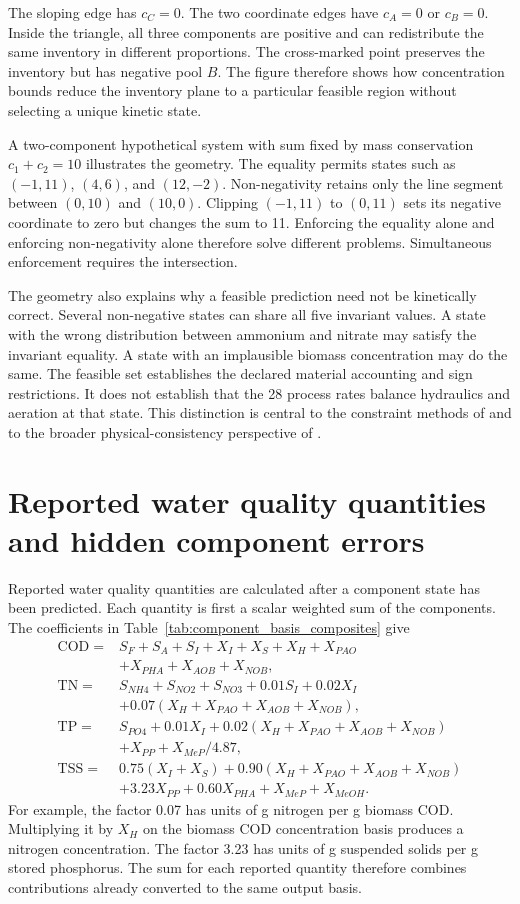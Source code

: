 The sloping edge has $c_C=0$. The two coordinate edges have $c_A=0$ or $c_B=0$. Inside the triangle, all three components are positive and can redistribute the same inventory in different proportions. The cross-marked point preserves the inventory but has negative pool $B$. The figure therefore shows how concentration bounds reduce the inventory plane to a particular feasible region without selecting a unique kinetic state.

A two-component hypothetical system with sum fixed by mass conservation $c_1+c_2=10$ illustrates the geometry. The equality permits states such as $(-1,11)$, $(4,6)$, and $(12,-2)$. Non-negativity retains only the line segment between $(0,10)$ and $(10,0)$. Clipping $(-1,11)$ to $(0,11)$ sets its negative coordinate to zero but changes the sum to 11. Enforcing the equality alone and enforcing non-negativity alone therefore solve different problems. Simultaneous enforcement requires the intersection.

The geometry also explains why a feasible prediction need not be kinetically correct. Several non-negative states can share all five invariant values. A state with the wrong distribution between ammonium and nitrate may satisfy the invariant equality. A state with an implausible biomass concentration may do the same. The feasible set establishes the declared material accounting and sign restrictions. It does not establish that the 28 process rates balance hydraulics and aeration at that state. This distinction is central to the constraint methods of \citet{KircherVotsmeier2025} and to the broader physical-consistency perspective of \citet{Valente2025}.

\section{Reported water quality quantities and hidden component errors}

Reported water quality quantities are calculated after a component state has been predicted. Each quantity is first a scalar weighted sum of the components. The coefficients in Table~\ref{tab:component_basis_composites} give
\[
\begin{aligned}
\mathrm{COD}={}&S_F+S_A+S_I+X_I+X_S+X_H+X_{PAO}\\
&+X_{PHA}+X_{AOB}+X_{NOB},\\[2pt]
\mathrm{TN}={}&S_{NH4}+S_{NO2}+S_{NO3}+0.01S_I+0.02X_I\\
&+0.07(X_H+X_{PAO}+X_{AOB}+X_{NOB}),\\[2pt]
\mathrm{TP}={}&S_{PO4}+0.01X_I+0.02(X_H+X_{PAO}+X_{AOB}+X_{NOB})\\
&+X_{PP}+X_{MeP}/4.87,\\[2pt]
\mathrm{TSS}={}&0.75(X_I+X_S)+0.90(X_H+X_{PAO}+X_{AOB}+X_{NOB})\\
&+3.23X_{PP}+0.60X_{PHA}+X_{MeP}+X_{MeOH}.
\end{aligned}
\]
For example, the factor 0.07 has units of g nitrogen per g biomass COD. Multiplying it by $X_H$ on the biomass COD concentration basis produces a nitrogen concentration. The factor 3.23 has units of g suspended solids per g stored phosphorus. The sum for each reported quantity therefore combines contributions already converted to the same output basis.

